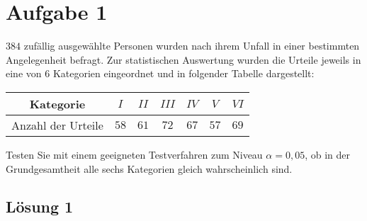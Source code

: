\documentclass[main.tex]{subfiles}
\begin{document}
\section{Aufgabe 1}
$384$ zufällig ausgewählte Personen wurden nach ihrem Unfall in einer bestimmten Angelegenheit befragt. Zur statistischen Auswertung wurden die Urteile jeweils in eine von $6$ Kategorien eingeordnet und in folgender Tabelle dargestellt:
\begin{center}
\begin{tabular}{c|c|c|c|c|c|c}
	Kategorie & $I$ & $II$ & $III$ & $IV$ & $V$ & $VI$ \\ \hline
	Anzahl der Urteile & $58$ & $61$ & $72$ & $67$ & $57$ & $69$
\end{tabular}
\end{center}
Testen Sie mit einem geeigneten Testverfahren zum Niveau $\alpha = 0,05$, ob in der Grundgesamtheit alle sechs Kategorien gleich wahrscheinlich sind.

\subsection{Lösung 1}
\end{document}
